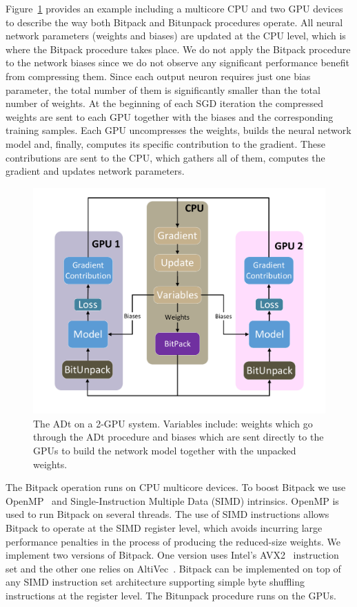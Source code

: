 Figure~\ref{bitpack_mgpu} provides an example including a multicore CPU and two GPU devices to describe the way both Bitpack and Bitunpack procedures operate.
All neural network parameters (weights and biases) are updated at the CPU level, which is where the Bitpack procedure takes place. 
We do not apply the Bitpack procedure to the network biases since we do not observe any significant performance benefit from compressing them.
Since each output neuron requires just one bias parameter, the total number of them is significantly smaller than the total number of weights.
At the beginning of each SGD iteration the compressed weights are sent to each GPU together with the biases and the corresponding training samples.
Each GPU uncompresses the weights, builds the neural network model  
and, finally, computes its specific contribution to the gradient.
These contributions are sent to the CPU, which gathers all of them, computes the gradient and updates network parameters.

\begin{figure}%
    \centerline{\includegraphics[scale=0.50]{bitpack/figs/drawing6.pdf}}
        \caption{The ADt on a 2-GPU system. Variables include: weights which go through
    the ADt procedure and biases which are sent directly to the GPUs to build the
    network model together with the unpacked weights.}
        \label{bitpack_mgpu}
\end{figure}

The Bitpack operation runs on CPU multicore devices.
To boost Bitpack  
we use OpenMP~\cite{openmp} and 
Single-Instruction Multiple Data (SIMD) intrinsics.
OpenMP is used to run Bitpack on several threads.
The use of SIMD instructions allows Bitpack to operate at the SIMD register level, which
avoids incurring large performance penalties in the process of producing the reduced-size weights.
We implement two versions of Bitpack.
One version uses Intel's AVX2~\cite{avx} instruction set and the other one relies on AltiVec~\cite{Altivec}. 
Bitpack can be implemented on top of any SIMD instruction set architecture supporting simple byte shuffling instructions at the register level.
The Bitunpack procedure runs on the GPUs.

